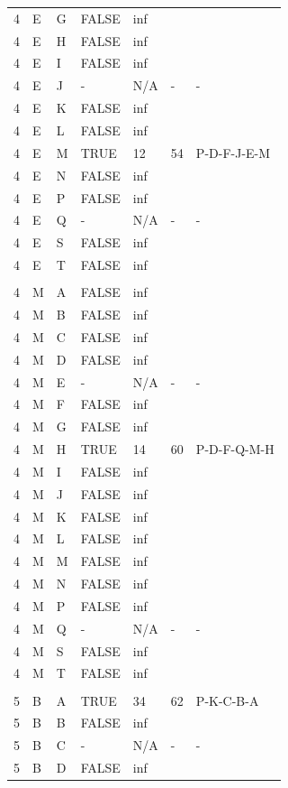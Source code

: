 \documentclass[11pt]{book}
\renewcommand{\=}[1]{\stackrel{#1}{=}} %
\theoremstyle{definition}
\theoremstyle{remark}
\begin{document}
\begin{longtable}{lllllll}
4 & E & G & FALSE & inf &  &  \\
4 & E & H & FALSE & inf &  &  \\
4 & E & I & FALSE & inf &  &  \\
4 & E & J & - & N/A & - & - \\
4 & E & K & FALSE & inf &  &  \\
4 & E & L & FALSE & inf &  &  \\
4 & E & M & TRUE & 12 & 54 & P-D-F-J-E-M \\
4 & E & N & FALSE & inf &  &  \\
4 & E & P & FALSE & inf &  &  \\
4 & E & Q & - & N/A & - & - \\
4 & E & S & FALSE & inf &  &  \\
4 & E & T & FALSE & inf &  &  \\
 &  &  &  &  &  &  \\
4 & M & A & FALSE & inf &  &  \\
4 & M & B & FALSE & inf &  &  \\
4 & M & C & FALSE & inf &  &  \\
4 & M & D & FALSE & inf &  &  \\
4 & M & E & - & N/A & - & - \\
4 & M & F & FALSE & inf &  &  \\
4 & M & G & FALSE & inf &  &  \\
4 & M & H & TRUE & 14 & 60 & P-D-F-Q-M-H \\
4 & M & I & FALSE & inf &  &  \\
4 & M & J & FALSE & inf &  &  \\
4 & M & K & FALSE & inf &  &  \\
4 & M & L & FALSE & inf &  &  \\
4 & M & M & FALSE & inf &  &  \\
4 & M & N & FALSE & inf &  &  \\
4 & M & P & FALSE & inf &  &  \\
4 & M & Q & - & N/A & - & - \\
4 & M & S & FALSE & inf &  &  \\
4 & M & T & FALSE & inf &  &  \\
 &  &  &  &  &  &  \\
5 & B & A & TRUE & 34 & 62 & P-K-C-B-A \\
5 & B & B & FALSE & inf &  &  \\
5 & B & C & - & N/A & - & - \\
5 & B & D & FALSE & inf &  &  \\

\end{longtable}
\end{document}
